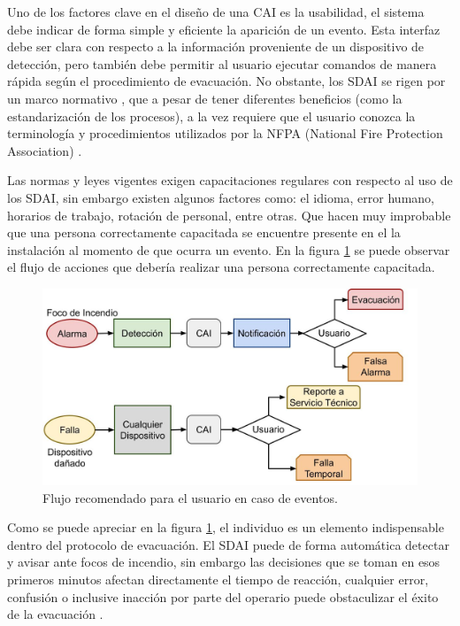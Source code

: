 Uno de los factores clave en el diseño de una CAI es la usabilidad, el sistema debe indicar de forma simple y eficiente la aparición de un evento. Esta interfaz debe ser clara con respecto a la información proveniente de un dispositivo de detección, pero también debe permitir al usuario ejecutar comandos de manera rápida según el procedimiento de evacuación. No obstante, los SDAI se rigen por un marco normativo \citep{nfpa_1}, que a pesar de tener diferentes beneficios (como la estandarización de los procesos), a la vez requiere que el usuario conozca la terminología y procedimientos utilizados por la NFPA (National Fire Protection Association) \citep{nfpa_2}. 

Las normas y leyes vigentes exigen capacitaciones regulares con respecto al uso de los SDAI, sin embargo existen algunos factores como: el idioma, error humano, horarios de trabajo, rotación de personal, entre otras.  Que hacen muy improbable que una persona correctamente capacitada se encuentre presente en el la instalación al momento de que ocurra un evento. En la figura \ref{fig:flujo_conv_user} se puede observar el flujo de acciones que debería realizar una persona correctamente capacitada.

\begin{figure}[ht]
    \centering
    \includegraphics[scale=.3]{./Figures/flujo_dec.jpg}
    \caption{Flujo recomendado para el usuario en caso de eventos.}
    \label{fig:flujo_conv_user}
\end{figure}

Como se puede apreciar en la figura \ref{fig:flujo_conv_user}, el individuo es un elemento indispensable dentro del protocolo de evacuación. El SDAI puede de forma automática detectar y avisar ante focos de incendio, sin embargo las decisiones que se toman en esos primeros minutos afectan directamente el tiempo de reacción, cualquier error, confusión o inclusive inacción por parte del operario puede obstaculizar el éxito de la evacuación \citep{plan_evac}.

